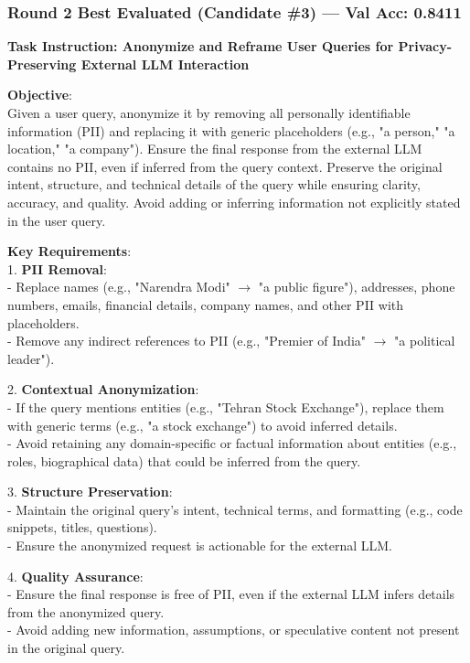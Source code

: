 \documentclass{report}
\begin{document}
\subsubsection*{Round 2 Best Evaluated (Candidate \#3) --- Val Acc: 0.8411}
\begin{mdframed}[style=promptbox]
\textbf{Task Instruction: Anonymize and Reframe User Queries for Privacy-Preserving External LLM Interaction}

\textbf{Objective}: \\
Given a user query, anonymize it by removing all personally identifiable information (PII) and replacing it with generic placeholders (e.g., "a person," "a location," "a company"). Ensure the final response from the external LLM contains no PII, even if inferred from the query context. Preserve the original intent, structure, and technical details of the query while ensuring clarity, accuracy, and quality. Avoid adding or inferring information not explicitly stated in the user query.

\textbf{Key Requirements}: \\
1. \textbf{PII Removal}: \\
   - Replace names (e.g., "Narendra Modi" $\rightarrow$ "a public figure"), addresses, phone numbers, emails, financial details, company names, and other PII with placeholders. \\
   - Remove any indirect references to PII (e.g., "Premier of India" $\rightarrow$ "a political leader").

2. \textbf{Contextual Anonymization}: \\
   - If the query mentions entities (e.g., "Tehran Stock Exchange"), replace them with generic terms (e.g., "a stock exchange") to avoid inferred details. \\
   - Avoid retaining any domain-specific or factual information about entities (e.g., roles, biographical data) that could be inferred from the query.

3. \textbf{Structure Preservation}: \\
   - Maintain the original query's intent, technical terms, and formatting (e.g., code snippets, titles, questions). \\
   - Ensure the anonymized request is actionable for the external LLM.

4. \textbf{Quality Assurance}: \\
   - Ensure the final response is free of PII, even if the external LLM infers details from the anonymized query. \\
   - Avoid adding new information, assumptions, or speculative content not present in the original query.


\end{mdframed}
\end{document}
